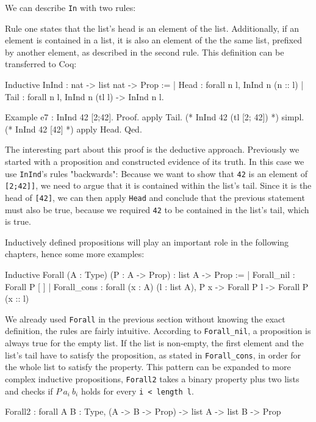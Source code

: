 \documentclass[fleqn]{scrreprt}
\newcommand{\coqinline}[1]{\texttt{#1}}
\begin{document}
\par
We can describe \coqinline{In} with two rules:
\begin{figure}[H]
	\begin{center}
		\begin{minipage}{.45 \linewidth}
			\infer[1]{\coqinline{In n (n :: l)}}{\phantom{premise}}
		\end{minipage}
		\hspace{.1 \linewidth}
		\begin{minipage}{.45 \linewidth}
			\infer[2]{\coqinline{In n (e :: l)}}{\coqinline{In n l}}
		\end{minipage}
	\end{center}
	\vspace*{-1em}
\end{figure}
Rule one states that the list's head is an element of the list. Additionally, if an element is contained in a list, it is also an element of the the same list, prefixed by another element, as described in the second rule. This definition can be transferred to Coq:
\begin{coqcode}
Inductive InInd : nat -> list nat -> Prop :=
| Head : forall n l, InInd n (n :: l)
| Tail : forall n l, InInd n (tl l) -> InInd n l.
\end{coqcode}
\begin{coqcode}
Example e7 : InInd 42 [2;42].
Proof. 
  apply Tail.  (* InInd 42 (tl [2; 42]) *)
  simpl.       (* InInd 42 [42] *)
  apply Head.
Qed.           
\end{coqcode}
The interesting part about this proof is the deductive approach. Previously we started with a proposition and constructed evidence of its truth. In this case we use \coqinline{InInd}'s rules "backwards": Because we want to show that \coqinline{42} is an element of \coqinline{[2;42]]}, we need to argue that it is contained within the list's tail. Since it is the head of \coqinline{[42]}, we can then apply \coqinline{Head} and conclude that the previous statement must also be true, because we required \coqinline{42} to be contained in the list's tail, which is true.
\par
Inductively defined propositions will play an important role in the following chapters, hence some more examples:
\begin{coqcode}
Inductive Forall (A : Type) (P : A -> Prop) : list A -> Prop :=
| Forall_nil : Forall P [ ]
| Forall_cons : forall (x : A) (l : list A), P x -> Forall P l -> Forall P (x :: l)
\end{coqcode}
We already used \coqinline{Forall} in the previous section without knowing the exact definition, the rules are fairly intuitive. According to \coqinline{Forall_nil}, a proposition is always true for the empty list. If the list is non-empty, the first element and the list's tail have to satisfy the proposition, as stated in \coqinline{Forall_cons}, in order for the whole list to satisfy the property. This pattern can be expanded to more complex inductive propositions, \coqinline{Forall2} takes a binary property plus two lists and checks if $P ~ a_{i} ~ b_{i}$ holds for every \coqinline{i < length l}.
\begin{coqcode}
Forall2 : forall A B : Type, (A -> B -> Prop) -> list A -> list B -> Prop
\end{coqcode}
\end{document}
